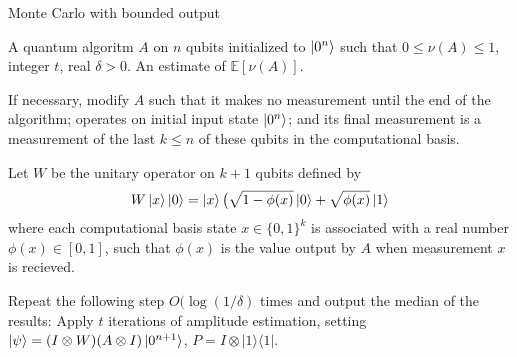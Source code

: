 \documentclass{article}
\begin{document}
\pagestyle{empty}

\begin{algorithm}[ht]
	\caption{Monte Carlo with bounded output}
	\begin{algorithmic}[1]

		\Require  A quantum algoritm $A$ on $n$ qubits initialized to $\ket{0^n}$ such that $0\leq \nu(A) \leq 1$, integer $t$, real $\delta>0$.
		\Ensure An estimate of $\mathbb{E}[\nu(A)]$.
		\vspace{10pt}
		\Statex

		\State If necessary, modify $A$ such that it makes no measurement until the end of the algorithm; operates on initial input state $\ket{0^n}$; and its final measurement is a measurement of the last $k\leq n$ of these qubits in the computational basis.

		\State Let $W$ be the unitary operator on $k+1$ qubits defined by
		       \begin{equation}
		       W\ket{x}\ket{0} =\ket{x}\big(\sqrt{1-\phi(x)}\ket{0}+\sqrt{\phi(x)}\ket{1}
		       \end{equation}
		       where each computational basis state $x \in \{0,1\}^k$ is associated with a real number $\phi(x) \in [0,1]$, such that $\phi(x)$ is the value output by $A$ when measurement $x$ is recieved.

		 \State Repeat the following step $O(\log(1/\delta)$ times and output the median of the results:
		 Apply $t$ iterations of amplitude estimation, setting $\ket{\psi} = (I \otimes W)(A \otimes I)\ket{0^{n+1}}$, $P = I \otimes |1\rangle\langle 1|$.


	\end{algorithmic}
\end{algorithm}
\end{document}
